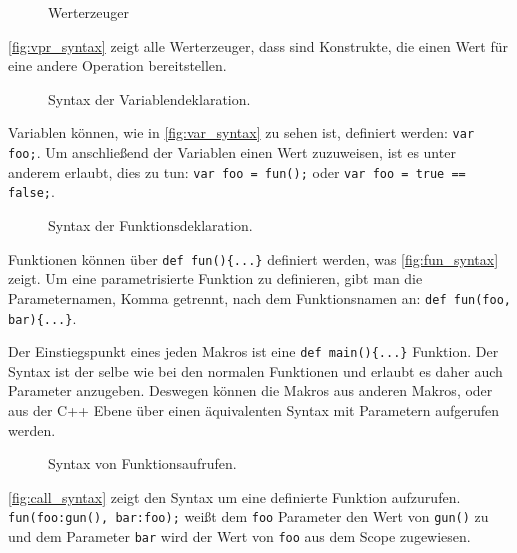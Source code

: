     \begin{figure}[H]
      \centering
      \caption{Werterzeuger}
      \label{fig:vpr_syntax}
    \end{figure}
    \autoref{fig:vpr_syntax} zeigt alle Werterzeuger, dass sind Konstrukte, die einen Wert für eine andere Operation bereitstellen.

    \begin{figure}[H]
      \centering
      \caption{Syntax der Variablendeklaration.}
      \label{fig:var_syntax}
    \end{figure}
    Variablen können, wie in \autoref{fig:var_syntax} zu sehen ist, definiert werden: \lstinline[style=MyMacroStyle]$var foo;$. Um anschließend der Variablen einen Wert zuzuweisen, ist es unter anderem erlaubt, dies zu tun: \lstinline[style=MyMacroStyle]$var foo = fun();$ oder \lstinline[style=MyMacroStyle]$var foo = true == false;$.

    \begin{figure}[H]
      \centering
      \caption{Syntax der Funktionsdeklaration.}
      \label{fig:fun_syntax}
    \end{figure}
    Funktionen können über \lstinline[style=MyMacroStyle]$def fun(){...}$ definiert werden, was \autoref{fig:fun_syntax} zeigt. Um eine parametrisierte Funktion zu definieren, gibt man die Parameternamen, Komma getrennt, nach dem Funktionsnamen an: \lstinline[style=MyMacroStyle]$def fun(foo, bar){...}$.

    Der Einstiegspunkt eines jeden Makros ist eine \lstinline[style=MyMacroStyle]$def main(){...}$ Funktion. Der Syntax ist der selbe wie bei den normalen Funktionen und erlaubt es daher auch Parameter anzugeben. Deswegen können die Makros aus anderen Makros, oder aus der C++ Ebene über einen äquivalenten Syntax mit Parametern aufgerufen werden.

    \begin{figure}[H]
      \centering
      \caption{Syntax von Funktionsaufrufen.}
      \label{fig:call_syntax}
    \end{figure}
    \autoref{fig:call_syntax} zeigt den Syntax um eine definierte Funktion aufzurufen. \lstinline[style=MyMacroStyle]$fun(foo:gun(), bar:foo);$ weißt dem \lstinline[style=MyMacroStyle]$foo$ Parameter den Wert von \lstinline[style=MyMacroStyle]$gun()$ zu und dem Parameter \lstinline[style=MyMacroStyle]$bar$ wird der Wert von \lstinline[style=MyMacroStyle]$foo$ aus dem Scope zugewiesen.

